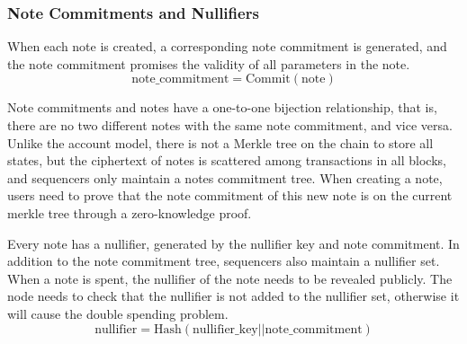 \subsubsection{Note Commitments and Nullifiers}\label{section: commitments-nullifiers}

When each note is created, a corresponding note commitment is generated, and the note commitment promises the validity of all parameters in the note.
\[ \text{note\_commitment} = \text{Commit}(\text{note})\]

Note commitments and notes have a one-to-one bijection relationship, that is, there are no two different notes with the same note commitment, and vice versa. Unlike the account model, there is not a Merkle tree on the chain to store all states, but the ciphertext of notes is scattered among transactions in all blocks, and sequencers only maintain a notes commitment tree. When creating a note, users need to prove that the note commitment of this new note is on the current merkle tree through a zero-knowledge proof.

Every note has a nullifier, generated by the nullifier key and note commitment. In addition to the note commitment tree, sequencers also maintain a nullifier set. When a note is spent, the nullifier of the note needs to be revealed publicly. The node needs to check that the nullifier is not added to the nullifier set, otherwise it will cause the double spending problem.
\[ \text{nullifier} = \mathrm{Hash}(\text{nullifier\_key} \mathbin{||} \text{note\_commitment}) \]
